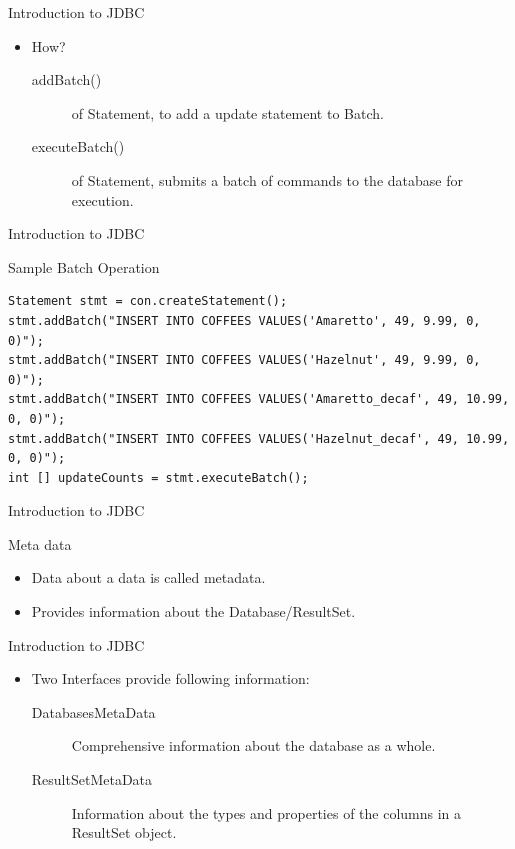 \documentclass[14pt]{beamer}
\begin{document}
\begin{frame}[fragile]{Introduction to JDBC}
\begin{itemize}
\item How?
\begin{description}
\item [addBatch()] of Statement, to add a update statement to Batch.
\item [executeBatch()] of Statement, submits a batch of commands to the database for execution.
\end{description}
\end{itemize}
\end{frame}

\begin{frame}[fragile]{Introduction to JDBC}
\begin{block}{}
Sample Batch Operation
\end{block}
\begin{lstlisting}[numbers=none]
Statement stmt = con.createStatement();
stmt.addBatch("INSERT INTO COFFEES VALUES('Amaretto', 49, 9.99, 0, 0)");
stmt.addBatch("INSERT INTO COFFEES VALUES('Hazelnut', 49, 9.99, 0, 0)");
stmt.addBatch("INSERT INTO COFFEES VALUES('Amaretto_decaf', 49, 10.99, 0, 0)");
stmt.addBatch("INSERT INTO COFFEES VALUES('Hazelnut_decaf', 49, 10.99, 0, 0)");
int [] updateCounts = stmt.executeBatch();
\end{lstlisting}
\end{frame}
\begin{frame}[fragile]{Introduction to JDBC}
\begin{block}{}
Meta data
\end{block}
\begin{itemize}
\item Data about a data is called metadata.
\item Provides information about the Database/ResultSet.
\end{itemize}
\end{frame}

\begin{frame}[fragile]{Introduction to JDBC}
\begin{itemize}
\item Two Interfaces provide following information:
\begin{description}
\item [DatabasesMetaData] Comprehensive information about the database as a whole.
\item [ResultSetMetaData] Information about the types and properties of the columns in a ResultSet object.
\end{description}
\end{itemize}
\end{frame}
\end{document}

